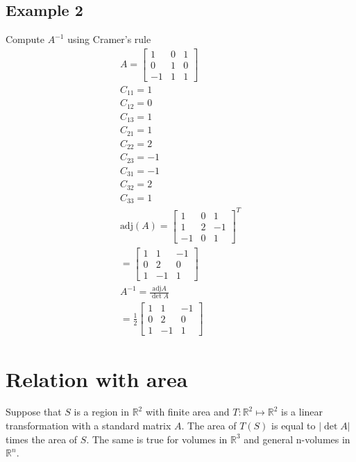 \documentclass{article}
\theoremstyle{mytheoremstyle}
\theoremstyle{mytheoremstyle}
\theoremstyle{myproblemstyle}
\newcommand\adj{\text{adj}}
\begin{document}
    \subsection*{Example 2}
    Compute $A^{-1}$ using Cramer's rule
    \begin{align*}
        A = \begin{bmatrix}
            1  & 0 & 1 \\
            0  & 1 & 0 \\
            -1 & 1 & 1
        \end{bmatrix} \\
        C_{11} = 1 \\
        C_{12} = 0 \\
        C_{13} = 1 \\
        C_{21} = 1 \\
        C_{22} = 2 \\
        C_{23} = -1 \\
        C_{31} = -1 \\
        C_{32} = 2 \\
        C_{33} = 1 \\
        \adj(A) = \begin{bmatrix}
            1 & 0 & 1 \\
            1 & 2 & -1 \\
            -1 & 0 & 1
        \end{bmatrix}^T \\
        = \begin{bmatrix}
            1 & 1 & -1 \\
            0 & 2 & 0 \\
            1 & -1 & 1
        \end{bmatrix} \\
        A^{-1} = \frac{\adj{A}}{\det{A}} \\
        = \frac{1}{2} \begin{bmatrix}
            1 & 1 & -1 \\
            0 & 2 & 0 \\
            1 & -1 & 1
        \end{bmatrix}
    \end{align*}

    \section*{Relation with area}

    Suppose that $S$ is a region in $\mathbb{R}^2$ with finite area and $T:
    \mathbb{R}^2 \mapsto \mathbb{R}^2$ is a linear transformation with a
    standard matrix $A$. The area of $T(S)$ is equal to $|\det A|$ times the
    area of $S$. The same is true for volumes in $\mathbb{R}^3$ and general
    n-volumes in $\mathbb{R}^n$.
\end{document}
